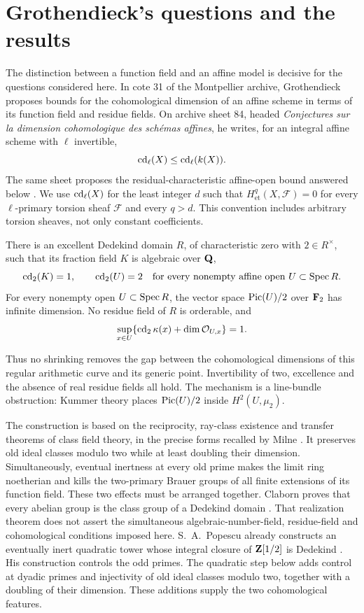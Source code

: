\section{Grothendieck's questions and the results}
The distinction between a function field and an affine model is decisive
for the questions considered here. In cote 31 of the Montpellier archive,
Grothendieck proposes bounds for the cohomological dimension of an affine
scheme in terms of its function field and residue fields. On archive
sheet 84, headed \emph{Conjectures sur la dimension cohomologique des
sch\'emas affines}, he writes, for an integral affine scheme with
$\ell$ invertible,
\[\operatorname{cd}_\ell(X)\leq\operatorname{cd}_\ell(k(X)).\]
The same sheet proposes the residual-characteristic affine-open bound
answered below \cite[sheet 84]{Grothendieck31}. We use $\operatorname{cd}_\ell(X)$ for the least integer $d$ such
that $H^q_{\mathrm{et}}(X,\mathcal F)=0$ for every $\ell$-primary torsion
sheaf $\mathcal F$ and every $q>d$. This convention includes arbitrary
torsion sheaves, not only constant coefficients.

\begin{theorem}\label{thm:arithmetic}
There is an excellent Dedekind domain $R$, of characteristic zero with
$2\in R^\times$, such that its fraction field $K$ is algebraic over $\mathbf Q$,
\[
 \operatorname{cd}_2(K)=1,\qquad
 \operatorname{cd}_2(U)=2\quad\text{for every nonempty affine open }U\subset\operatorname{Spec} R.
\]
For every nonempty open $U\subset\operatorname{Spec} R$, the vector space
$\operatorname{Pic}(U)/2$ over $\mathbf F_2$ has infinite dimension. No residue field of $R$
is orderable, and
\[
 \sup_{x\in U}\{\operatorname{cd}_2\kappa(x)+\dim\mathcal O_{U,x}\}=1.
\]
\end{theorem}

Thus no shrinking removes the gap between the cohomological dimensions
of this regular arithmetic curve and its generic point. Invertibility
of two, excellence and the absence of real residue fields all hold. The
mechanism is a line-bundle obstruction: Kummer theory places
$\operatorname{Pic}(U)/2$ inside $H^2(U,\mu_2)$.

The construction is based on the reciprocity, ray-class existence and
transfer theorems of class field theory, in the precise forms recalled
by Milne \cite{MilneCFT}. It preserves old ideal classes modulo two
while at least doubling their dimension. Simultaneously, eventual
inertness at every old prime makes the limit ring noetherian and kills
the two-primary Brauer groups of all finite extensions of its function
field. These two effects must be arranged together. Claborn proves that
every abelian group is the class group of a Dedekind domain
\cite[Theorem 7, p.~222]{Claborn}. That realization theorem does not assert
the simultaneous algebraic-number-field, residue-field and cohomological
conditions imposed here.
S.~A.~Popescu already constructs an eventually inert quadratic tower
whose integral closure of $\mathbf Z[1/2]$ is Dedekind
\cite[\S5, pp.~511--512]{Popescu2022}. His construction controls
the odd primes. The quadratic step below adds control at dyadic primes
and injectivity of old ideal classes modulo two, together with a doubling
of their dimension. These additions supply the two cohomological features.

